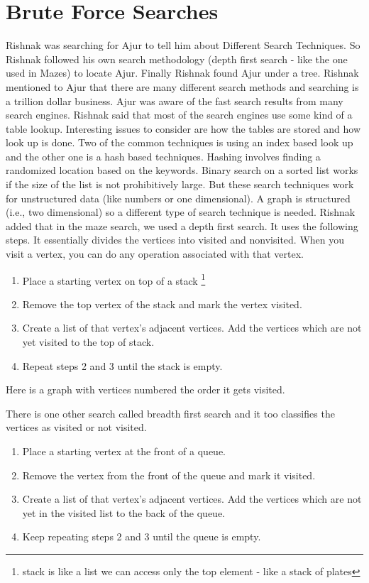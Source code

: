 \chapter{Brute Force Searches}

Rishnak was searching for Ajur to tell him about Different Search Techniques. So Rishnak followed his own search methodology (depth first search - like the one used in Mazes) to locate Ajur. Finally Rishnak found Ajur under a tree. Rishnak mentioned to Ajur that there are many different search methods and searching is a trillion dollar business. Ajur was aware of the fast search results from many search engines. Rishnak said that most of the search engines use some kind of a table lookup. Interesting issues to consider are how the tables are stored and how look up is done. Two of the common techniques is using an index based look up and the other one is a hash based techniques. Hashing involves finding a randomized location based on the keywords.  Binary search on a sorted list works if the size of the list is not prohibitively large. But these search techniques work for unstructured data (like numbers or one dimensional). A graph is structured (i.e., two dimensional) so a different type of search technique is needed.
Rishnak added that in the maze search, we used a depth first search. It uses the following steps. It essentially divides the vertices into visited and nonvisited. When you visit a vertex, you can do any
operation associated with that vertex.

\begin{enumerate}
    \item Place a starting vertex on top of a stack \footnote{stack is like a list we can access only the top element - like a stack of plates}
     \item Remove the top vertex of the stack and mark the vertex visited.
     \item Create a list of that vertex's adjacent vertices. Add the vertices which are not yet visited  to the top of stack.
     \item Repeat steps 2 and 3 until the stack is empty.
\end{enumerate}

Here is a graph with vertices numbered the order it gets visited.


There is one other search called breadth first search and it too classifies the vertices as visited or not visited.
\begin{enumerate}
    \item Place a starting vertex at the front of a queue.
    \item Remove the vertex from the front of the queue and mark it visited.
    \item Create a list of that vertex's adjacent vertices. Add the vertices which are not yet in the visited list to the back of the queue.
    \item Keep repeating steps 2 and 3 until the queue is empty.
\end{enumerate}

